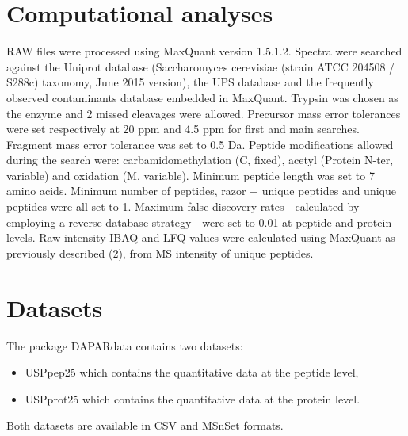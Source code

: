 \documentclass[12pt,a4paper]{article}
\begin{document}
\section{Computational analyses}
RAW files were processed using MaxQuant version 1.5.1.2. Spectra were searched against the Uniprot database
(Saccharomyces cerevisiae (strain ATCC 204508 / S288c) taxonomy,
June 2015 version), the UPS database and the frequently observed
contaminants database embedded in MaxQuant. Trypsin was chosen as the
enzyme and 2 missed cleavages were allowed. Precursor mass error tolerances
were set respectively at 20 ppm and 4.5 ppm for first and main searches.
Fragment mass error tolerance was set to 0.5 Da. Peptide modifications allowed
during the search were: carbamidomethylation (C, fixed), acetyl
(Protein N-ter, variable) and oxidation (M, variable). Minimum peptide length
was set to 7 amino acids. Minimum number of peptides, razor + unique peptides
and unique peptides were all set to 1. Maximum false discovery rates -
calculated by employing a reverse database strategy - were set to 0.01 at
peptide and protein levels. Raw intensity IBAQ and LFQ values were calculated
using MaxQuant as previously described (2), from MS intensity of unique
peptides. 

\section{Datasets}
The package DAPARdata contains two datasets:
\begin{itemize}
\item USPpep25 which contains the quantitative data at the peptide level,
\item USPprot25 which contains the quantitative data at the protein level.
\end{itemize}
Both datasets are available in CSV and MSnSet formats.
\end{document}
